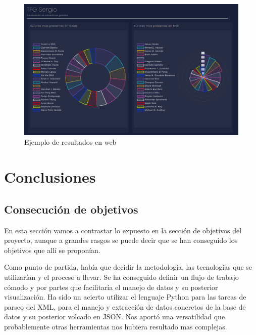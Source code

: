 \documentclass[a4paper, 12pt]{book}
\begin{document}
\begin{figure}[h]
  \centering
  \includegraphics[width=16cm, keepaspectratio]{img/res_web.png}
  \caption{Ejemplo de resultados en web}
  \label{fig:res_web}
\end{figure}



\cleardoublepage
\chapter{Conclusiones}
\label{chap:conclusiones}
\section{Consecución de objetivos}
\label{sec:consecucion-objetivos}

En esta sección vamos a contrastar lo expuesto en la sección de objetivos del proyecto, aunque a grandes rasgos se puede decir que se han conseguido los objetivos que allí se proponían.

Como punto de partida, había que decidir la metodología, las tecnologías que se utilizarían y el proceso a llevar. Se ha conseguido definir un flujo de trabajo cómodo y por partes que facilitaría el manejo de datos y su posterior visualización. Ha sido un acierto utilizar el lenguaje Python para las tareas de parseo del XML, para el manejo y extracción de datos concretos de la base de datos y su posterior volcado en JSON. Nos aportó una versatilidad que probablemente otras herramientas nos hubiera resultado mas complejas.
\end{document}
